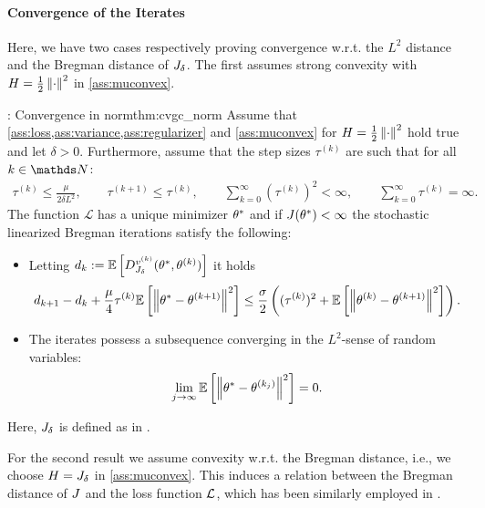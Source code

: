 \paragraph{Convergence of the Iterates}
Here, we have two cases respectively proving convergence w.r.t. the $L^2$ distance and the Bregman distance of $J_\delta$. The first assumes strong convexity with $H=\frac{1}{2}\left\|\cdot\right\|^2$ in \cref{ass:muconvex}.
%
%
\begin{theorem}{\cite[Th. 6]{bungert2022bregman}: Convergence in norm}{thm:cvgc_norm}
Assume that \cref{ass:loss,ass:variance,ass:regularizer} and \cref{ass:muconvex} for $H=\frac{1}{2}\left\|\cdot\right\|^2$ hold true and let $\delta>0$.
Furthermore, assume that the step sizes $\tau^{(k)}$ are such that for all $k\in\N$:
\begin{align*}
    {\tau^{(k)}\leq \frac{\mu}{2\delta L^2}},\qquad
    \tau^{(k+1)} \leq \tau^{(k)}, \qquad
    \sum_{k=0}^\infty (\tau^{(k)})^2 < \infty, \qquad
    \sum_{k=0}^\infty \tau^{(k)} = \infty.
\end{align*}
The function $\mathcal{L}$ has a unique minimizer $\theta^*$ and if $J(\theta^*)<\infty$ the stochastic linearized Bregman iterations  satisfy the following:
\begin{itemize}
    \item Letting $d_k:=\mathbb{E}\left[D_{J_\delta}^{v^{(k)}}(\theta^*,\theta^{(k)})\right]$ it holds
    \begin{align}\label{ineq:decay_bregman_distance}
        d_{k+1} - d_k + \frac{\mu}{4}\tau^{(k)}\mathbb{E}\left[\left\|\theta^*-\theta^{(k+1)}\right\|^2\right]
        \leq  \frac{\sigma}{2}\left((\tau^{(k)})^2 +\mathbb{E}\left[\left\|\theta^{(k)} - \theta^{(k+1)}\right\|^2\right]\right).
    \end{align}
    \item The iterates possess a subsequence converging in the $L^2$-sense of random variables: 
    \begin{align}
        \lim_{j\to\infty}\mathbb{E}\left[\left\|\theta^*-\theta^{(k_j)}\right\|^2\right] = 0.
    \end{align}
\end{itemize}
{Here, $J_\delta$ is defined as in .}
\end{theorem}
%
%
\noindent%
For the second result we assume convexity w.r.t. the Bregman distance, i.e., we choose $H=J_{\delta}$ in \cref{ass:muconvex}. This induces a relation between the Bregman distance of $J$ and the loss function $\mathcal{L}$, which has been similarly employed in \cite{dragomir2021fast}.
